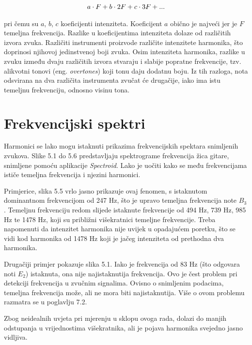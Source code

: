 \documentclass[times, utf8, diplomski, numeric]{fer}
\begin{document}
\begin{equation}
	a \cdot F + b \cdot 2F + c \cdot 3F + ...\\
\end{equation}

pri čemu su $a$, $b$, $c$ koeficijenti intenziteta. Koeficijent $a$ obično je najveći jer je $F$ temeljna frekvencija. Razlike u koeficijentima intenziteta dolaze od različitih izvora zvuka. Različiti instrumenti proizvode različite intenzitete harmonika, što doprinosi njihovoj jedinstvenoj boji zvuka. Osim intenziteta harmonika, razlike u zvuku između dvaju različitih izvora stvaraju i slabije popratne frekvencije, tzv. alikvotni tonovi (eng. \textit{overtones}) koji tonu daju dodatnu boju.\cite{christensen1987science} Iz tih razloga, nota odsvirana na dva različita instrumenta zvučat će drugačije, iako ima istu temeljnu frekvenciju, odnosno visinu tona.

\section{Frekvencijski spektri}
Harmonici se lako mogu istaknuti prikazima frekvencijskih spektara snimljenih zvukova. Slike 5.1 do 5.6 predstavljaju spektrograme frekvencija žica gitare, snimljene pomoću aplikacije \textit{Spectroid}.\cite{reinke_2018} Lako je uočiti kako se među frekvencijama ističe temeljna frekvencija i njezini harmonici.

Primjerice, slika 5.5 vrlo jasno prikazuje ovaj fenomen, s istaknutom dominantnom frekvencijom od 247 Hz, što je upravo temeljna frekvencija note $B_3$. Temeljnu frekvenciju redom slijede istaknute frekvencije od 494 Hz, 739 Hz, 985 Hz te 1478 Hz, koji su približni višekratnici temeljne frekvencije. Treba napomenuti da intenzitet harmonika nije uvijek u opadajućem poretku, što se vidi kod harmonika od 1478 Hz koji je jačeg intenziteta od prethodna dva harmonika.

Drugačiji primjer pokazuje slika 5.1. Iako je frekvencija od 83 Hz (što odgovara noti $E_2$) istaknuta, ona nije najistaknutija frekvencija. Ovo je čest problem pri detekciji frekvencija u zvučnim signalima. Ovisno o snimljenim podacima, temeljna frekvencija može, ali ne mora biti najistaknutija.\cite{gustine_2021} Više o ovom problemu razmatra se u poglavlju 7.2.

Zbog neidealnih uvjeta pri mjerenju u sklopu ovoga rada, dolazi do manjih odstupanja u vrijednostima višekratnika, ali je pojava harmonika svejedno jasno vidljiva.
\end{document}

